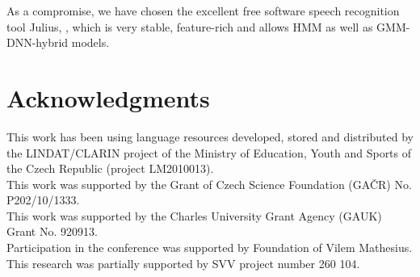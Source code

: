 \documentclass{llncs}
\begin{document}
As a compromise, we have chosen the excellent free software speech recognition
tool Julius\cite{lee2001julius}, \cite{lee2009recent}, which is very stable,
feature-rich and allows HMM as well as GMM-DNN-hybrid models.

\section*{Acknowledgments}

This work has been using language resources developed, stored and distributed by the LINDAT/CLARIN project of the Ministry of Education, Youth and Sports of the Czech Republic (project LM2010013).
\\
This work was supported by the Grant of Czech Science Foundation (GA\v{C}R) No. P202/10/1333.
\\
This work was supported by the Charles University Grant Agency (GAUK) Grant No. 920913.
\\
Participation in the conference was supported by Foundation of Vilem Mathesius.
\\
This research was partially supported by SVV project number 260 104.



\begin{thebibliography}{}

\end{thebibliography}
%
\end{document}
